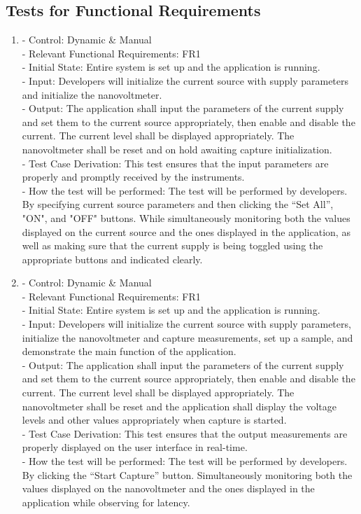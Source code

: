 \documentclass[12pt, titlepage]{article}
\begin{document}
\subsection{Tests for Functional Requirements}
\label{FR-T}
\begin{enumerate}[{FR-T}1.]
    \item\label{T1} - Control: Dynamic \& Manual\\ 
    - Relevant Functional Requirements: FR1\\
    - Initial State: Entire system is set up and the application is running.\\
    - Input: Developers will initialize the current source with supply parameters and initialize the nanovoltmeter.\\
    - Output: The application shall input the parameters of the current supply and set them to the current source appropriately, then enable and disable the current. The current level shall be displayed appropriately. The nanovoltmeter shall be reset and on hold awaiting capture initialization.\\
    - Test Case Derivation: This test ensures that the input parameters are properly and promptly received by the instruments.\\
    - How the test will be performed: The test will be performed by developers. By specifying current source parameters and then clicking the “Set All”, "ON", and "OFF" buttons. While simultaneously monitoring both the values displayed on the current source and the ones displayed in the application, as well as making sure that the current supply is being toggled using the appropriate buttons and indicated clearly.
    
    \item\label{T2} - Control: Dynamic \& Manual\\ 
    - Relevant Functional Requirements: FR1\\
    - Initial State: Entire system is set up and the application is running.\\
    - Input: Developers will initialize the current source with supply parameters, initialize the nanovoltmeter and capture measurements, set up a sample, and demonstrate the main function of the application.\\
    - Output: The application shall input the parameters of the current supply and set them to the current source appropriately, then enable and disable the current. The current level shall be displayed appropriately. The nanovoltmeter shall be reset and the application shall display the voltage levels and other values appropriately when capture is started.\\
    - Test Case Derivation: This test ensures that the output measurements are properly displayed on the user interface in real-time.\\
    - How the test will be performed: The test will be performed by developers. By clicking the “Start Capture” button. Simultaneously monitoring both the values displayed on the nanovoltmeter and the ones displayed in the application while observing for latency.
    

\end{enumerate}
\end{document}
